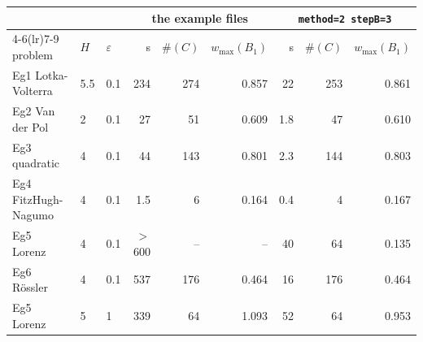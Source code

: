 \begin{tabular}{lll rrr rrr}
\toprule
& & & \multicolumn{3}{c}{the example files} & \multicolumn{3}{c}{\texttt{method=2 stepB=3}} \\
\cmidrule(lr){4-6}\cmidrule(lr){7-9}
problem & $H$ & $\varepsilon$ & s & $\#(C)$ & $w_{\max}(B_1)$ & s & $\#(C)$ & $w_{\max}(B_1)$ \\
\midrule
Eg1 Lotka-Volterra & 5.5 & 0.1 & 234 & 274 & 0.857 & 22 & 253 & 0.861 \\
Eg2 Van der Pol & 2 & 0.1 & 27 & 51 & 0.609 & 1.8 & 47 & 0.610 \\
Eg3 quadratic & 4 & 0.1 & 44 & 143 & 0.801 & 2.3 & 144 & 0.803 \\
Eg4 FitzHugh-Nagumo & 4 & 0.1 & 1.5 & 6 & 0.164 & 0.4 & 4 & 0.167 \\
Eg5 Lorenz & 4 & 0.1 & $>$600 & -- & -- & 40 & 64 & 0.135 \\
Eg6 R\"ossler & 4 & 0.1 & 537 & 176 & 0.464 & 16 & 176 & 0.464 \\
Eg5 Lorenz & 5 & 1 & 339 & 64 & 1.093 & 52 & 64 & 0.953 \\
\bottomrule
\end{tabular}
